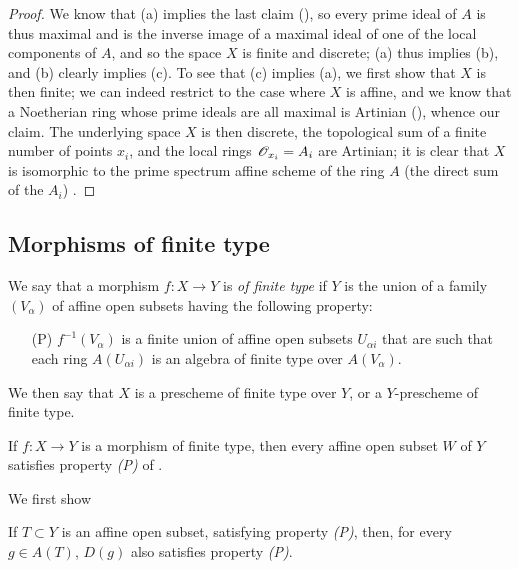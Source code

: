 \begin{proof}
\label{proof-I.6.2.2}
We know that (a) implies the last claim (\cite[p.~205, th.~3]{I-13}), so every prime ideal of $A$ is thus maximal and is the inverse image of a maximal ideal of one of the local components of $A$, and so the space $X$ is finite and discrete;
(a) thus implies (b), and (b) clearly implies (c).
To see that (c) implies (a), we first show that $X$ is then finite;
we can indeed restrict to the case where $X$ is affine, and we know that a Noetherian ring whose prime ideals are all maximal is Artinian (\cite[p.~203]{I-13}), whence our claim.
The underlying space $X$ is then discrete, the topological sum of a finite number of points $x_i$, and the local rings $\mathscr{O}_{x_i}=A_i$ are Artinian;
it is clear that $X$ is isomorphic to the prime spectrum affine scheme of the ring $A$ (the direct sum of the $A_i$) .
\end{proof}

\subsection{Morphisms of finite type}
\label{subsection:I.6.3}

\begin{definition}[6.3.1]
\label{I.6.3.1}
We say that a morphism $f:X\to Y$ is \emph{of finite type} if $Y$ is the union of a family $(V_\alpha)$ of affine open subsets having the following property:
\begin{enumerate}
  \item[(P)] $f^{-1}(V_\alpha)$ is a finite union of affine open subsets $U_{\alpha i}$ that are such that each ring $A(U_{\alpha i})$ is an algebra of finite type over $A(V_\alpha)$.
\end{enumerate}
We then say that $X$ is a prescheme of finite type over $Y$, or a $Y$-prescheme of finite type.
\end{definition}

\begin{proposition}[6.3.2]
\label{I.6.3.2}
If $f:X\to Y$ is a morphism of finite type, then every affine open subset $W$ of $Y$ satisfies property \emph{(P)} of .
\end{proposition}

We first show
\begin{lemma}[6.3.2.1]
\label{I.6.3.2.1}
If $T\subset Y$ is an affine open subset, satisfying property \emph{(P)}, then, for every $g\in A(T)$, $D(g)$ also satisfies property \emph{(P)}.
\end{lemma}

